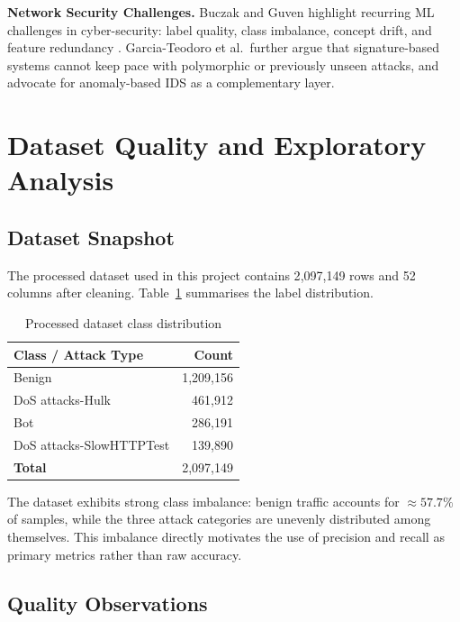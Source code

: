 \documentclass[10pt,conference]{IEEEtran}
\begin{document}
\textbf{Network Security Challenges.} Buczak and Guven highlight
recurring ML challenges in cyber-security: label quality, class
imbalance, concept drift, and feature redundancy \cite{buczak2016}.
Garcia-Teodoro et al.\ further argue that signature-based systems
cannot keep pace with polymorphic or previously unseen attacks, and
advocate for anomaly-based IDS as a complementary layer.

\section{Dataset Quality and Exploratory Analysis}
\label{sec:eda}

\subsection{Dataset Snapshot}

The processed dataset used in this project contains 2{,}097{,}149 rows
and 52 columns after cleaning. Table~\ref{tab:distribution} summarises
the label distribution.

\begin{table}[H]
\centering
\caption{Processed dataset class distribution}
\label{tab:distribution}
\begin{tabular}{lr}
\toprule
\textbf{Class / Attack Type} & \textbf{Count} \\
\midrule
Benign                        & 1,209,156 \\
DoS attacks-Hulk              &   461,912 \\
Bot                           &   286,191 \\
DoS attacks-SlowHTTPTest      &   139,890 \\
\midrule
\textbf{Total}                & 2,097,149 \\
\bottomrule
\end{tabular}
\end{table}

The dataset exhibits strong class imbalance: benign traffic accounts
for $\approx57.7\%$ of samples, while the three attack categories are
unevenly distributed among themselves. This imbalance directly
motivates the use of precision and recall as primary metrics rather
than raw accuracy.

\subsection{Quality Observations}
\end{document}
